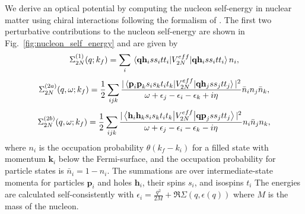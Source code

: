\documentclass[preprintnumbers,floatfix,aps,prc,preprint,nofootinbib]{revtex4-1}
\begin{document}
We derive an optical potential by computing the nucleon self-energy in nuclear matter using chiral interactions following the formalism of \cite{Whitehead:2018bfs}. The first two perturbative contributions to the nucleon self-energy are shown in Fig.~\ref{fig:nucleon_self_energy} and are given by
%
\begin{eqnarray}
	\label{eq:nucleon_self_energy_1}
	\Sigma_{2N}^{(1)} (q; k_f) = \sum_i \mel{\textbf{q} \textbf{h}_i s s_i t t_i}{V_{2N}^{eff}}{\textbf{q} \textbf{h}_i s s_i t t_i} n_i,
\end{eqnarray}
%
\begin{eqnarray}
	\label{eq:nucleon_self_energy_2a}
	\Sigma_{2N}^{(2a)} (q, \omega; k_f) = \frac{1}{2} \sum_{ijk} \frac{|\mel{\textbf{p}_i \textbf{p}_k s_i s_k t_i t_k}{V_{2N}^{eff}}{\textbf{q} \textbf{h}_j s s_j t t_j}|^2}{\omega+\epsilon_j-\epsilon_i-\epsilon_k+i \eta} \bar{n}_i n_j \bar{n}_k,
\end{eqnarray}
%
\begin{eqnarray}
	\label{eq:nucleon_self_energy_2b}
	\Sigma_{2N}^{(2b)} (q, \omega; k_f) = \frac{1}{2} \sum_{ijk} \frac{|\mel{\textbf{h}_i \textbf{h}_k s_i s_k t_i t_k}{V_{2N}^{eff}}{\textbf{q} \textbf{p}_j s s_j t t_j}|^2}{\omega+\epsilon_j-\epsilon_i-\epsilon_k-i \eta} n_i \bar{n}_j n_k,
\end{eqnarray}
%
where $n_i$ is the occupation probability $\theta(k_f - k_i)$ for a filled state with momentum $\textbf{k}_i$ below the Fermi-surface, and the occupation probability for particle states is $\bar{n}_i = 1 - n_i$. The summations are over intermediate-state momenta for particles $\textbf{p}_i$ and holes $\textbf{h}_i$, their spins $s_i$, and isospins $t_i$ The energies are calculated self-consistently with $\epsilon_i = \frac{q^2}{2 M} + \Re \Sigma(q, \epsilon(q))$ where $M$ is the mass of the nucleon.
\\
\end{document}
